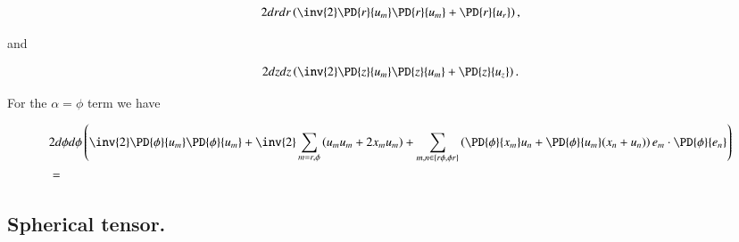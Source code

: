 \begin{equation}\label{eqn:continuumL2:n}
2 dr dr 
\left( 
\inv{2}
\PD{r}{u_m} 
\PD{r}{u_m} 
+
\PD{r}{u_r} 
\right),
\end{equation}

and

\begin{equation}\label{eqn:continuumL2:n}
2 dz dz 
\left( 
\inv{2}
\PD{z}{u_m} 
\PD{z}{u_m} 
+
\PD{z}{u_z} 
\right).
\end{equation}

For the $\alpha = \phi$ term we have

\begin{align*}
&2 d\phi d\phi 
\left( 
\inv{2}
\PD{\phi}{u_m} 
\PD{\phi}{u_m} 
+ 
\inv{2}
\sum_{m = r, \phi}
\left(
u_m u_m 
+
2 x_m u_m 
\right)
+
\sum_{m, n \in \{r \phi, \phi r\}}
\left(
\PD{\phi}{x_m}
u_n
+
\PD{\phi}{u_m}(
x_n
+
u_n
)
\right)
e_m \cdot 
\PD{\phi}{e_n}
\right) \\
&=
\end{align*}

\subsection{Spherical tensor.}

\EndArticle
